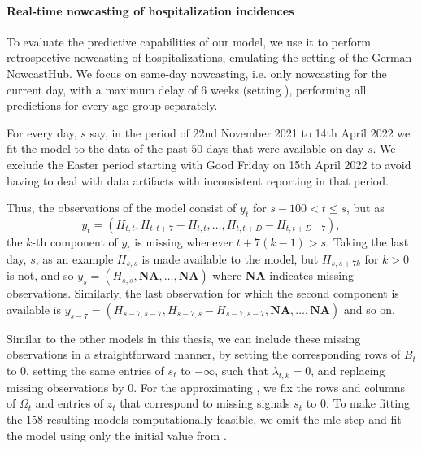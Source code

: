 \paragraph{Real-time nowcasting of hospitalization incidences}
\newcommand*{\ssm}{\texttt{SSM}\xspace}
\newcommand*{\ilmprop}{\texttt{ILM-prop42}\xspace}
\newcommand*{\ensemble}{\texttt{MeanEnsemble}\xspace}
To evaluate the predictive capabilities of our model, we use it to perform retrospective nowcasting of hospitalizations, emulating the setting of the German NowcastHub. 
We focus on same-day nowcasting, i.e. only nowcasting for the current day, with a maximum delay of $6$ weeks (setting ),   performing all predictions for every age group separately. 

For every day, $s$ say, in the period of 22nd November 2021 to 14th April 2022 we fit the model to the data of the past $50$ days that were available on day $s$. 
We exclude the Easter period starting with Good Friday on 15th April 2022 to avoid having to deal with data artifacts with inconsistent reporting in that period.

Thus, the observations of the model consist of $y_{t}$ for $s - 100 < t \leq s$, but as 
$$
    y_{t} = \left( H_{t,t}, H_{t, t + 7} - H_{t,t}, \dots, H_{t, t + D}  - H_{t,t + D - 7}\right),
$$
the $k$-th component of $y_{t}$ is missing whenever $t + 7(k - 1) > s$. 
Taking the last day, $s$, as an example $H_{s,s}$ is made available to the model, but $H_{s, s+7k}$ for $k > 0$ is not, and so $y_{s} = \left( H_{s,s}, \textbf{NA}, \dots, \textbf{NA} \right)$ where \textbf{NA} indicates missing observations. Similarly, the last observation for which the second component is available is $y_{s - 7} = \left( H_{s-7, s-7}, H_{s-7, s} - H_{s - 7, s - 7}, \textbf{NA}, \dots, \textbf{NA} \right)$ and so on. 

Similar to the other models in this thesis, we can include these missing observations in a straightforward manner, by setting the corresponding rows of $B_{t}$ to $0$, setting the same entries of $s_{t}$ to $-\infty$, such that $\lambda_{t,k} = 0$, and replacing missing observations by $0$. For the approximating , we fix the rows and columns of $\Omega_{t}$ and entries of $z_{t}$ that correspond to missing signals $s_{t}$ to $0$. 
To make fitting the 158 resulting models computationally feasible, we omit the \acrshort{mle} step and fit the model using only the initial value from . 


